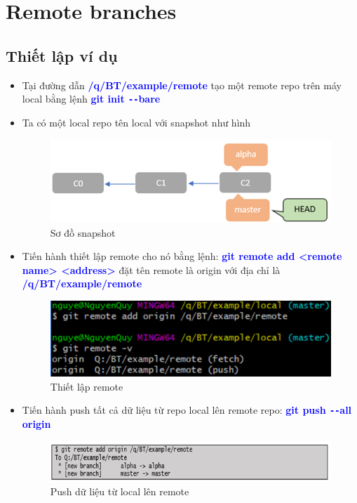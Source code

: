 \documentclass[12pt,a4paper]{report}
\begin{document}
\section{Remote branches}
\subsection{Thiết lập ví dụ}
\begin{itemize}
\item Tại đường dẫn \textcolor{blue}{\bf /q/BT/example/remote} tạo một remote repo trên máy local bằng lệnh \textcolor{blue}{\bf git init \texttt{-{}-}bare}
\item Ta có một local repo tên local với snapshot như hình

\begin{figure}[!ht]
	\centering	
	\includegraphics[width=0.8\linewidth]{screenshot065}
	\caption{Sơ đồ snapshot}
	\label{fig:screenshot065}
\end{figure}

\item Tiến hành thiết lập remote cho nó bằng lệnh: \textcolor{blue}{\bf git remote add <remote  name> <address>} đặt tên remote là origin với địa chỉ là \textcolor{blue}{\bf /q/BT/example/remote}

\begin{figure}[!ht]
	\centering
	\includegraphics[width=0.8\linewidth]{screenshot066}
\caption{Thiết lập remote}
	\label{fig:screenshot066}
	\end{figure}
	
\item Tiến hành push tất cả dữ liệu từ repo local lên remote repo: \textcolor{blue}{\bf git push \texttt{-{}-}all origin}

\begin{figure}[!ht]
	\centering
	\includegraphics[width=0.8\linewidth]{screenshot07}
\caption{Push dữ liệu từ local lên remote}
	\label{fig:screenshot07}
	\end{figure}


\end{itemize}
\end{document}

